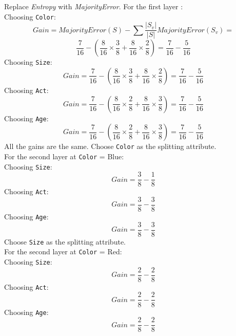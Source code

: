  Replace \textit{Entropy} with \textit{MajorityError}.
For the first layer :\\
Choosing \texttt{Color}:
\begin{equation*}
	Gain = MajorityError(S) - \sum \frac{|S_v|}{|S|}MajorityError(S_v)=
\end{equation*}
\begin{equation*}
	\frac{7}{16} - (\frac{8}{16}\times\frac{3}{8}+ \frac{8}{16}\times\frac{2}{8}) = \frac{7}{16} - \frac{5}{16}
\end{equation*}
Choosing \texttt{Size}:
\begin{equation*}
	Gain = \frac{7}{16} - (\frac{8}{16}\times\frac{3}{8}+ \frac{8}{16}\times\frac{2}{8}) = \frac{7}{16} - \frac{5}{16}
\end{equation*}
Choosing \texttt{Act}:
\begin{equation*}
	Gain = \frac{7}{16} - (\frac{8}{16}\times\frac{2}{8}+ \frac{8}{16}\times\frac{3}{8}) = \frac{7}{16} - \frac{5}{16}
\end{equation*}
Choosing \texttt{Age}:
\begin{equation*}
	Gain = \frac{7}{16} - (\frac{8}{16}\times\frac{2}{8}+ \frac{8}{16}\times\frac{3}{8}) = \frac{7}{16} - \frac{5}{16}
\end{equation*}
All the gains are the same. Choose \texttt{Color} as the splitting attribute.\\
For the second layer at \texttt{Color} = Blue:\\
Choosing \texttt{Size}:
\begin{equation*}
	Gain = \frac{3}{8} - \frac{1}{8}
\end{equation*}
Choosing \texttt{Act}:
\begin{equation*}
	Gain = \frac{3}{8} - \frac{3}{8}
\end{equation*}
Choosing \texttt{Age}:
\begin{equation*}
	Gain = \frac{3}{8} - \frac{3}{8}
\end{equation*}
Choose \texttt{Size} as the splitting attribute.\\
For the second layer at \texttt{Color} = Red:\\
Choosing \texttt{Size}:
\begin{equation*}
	Gain = \frac{2}{8} - \frac{2}{8}
\end{equation*}
Choosing \texttt{Act}:
\begin{equation*}
	Gain = \frac{2}{8} - \frac{2}{8}
\end{equation*}
Choosing \texttt{Age}:
\begin{equation*}
	Gain = \frac{2}{8} - \frac{2}{8}
\end{equation*}
